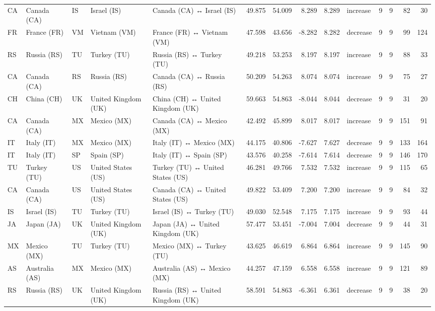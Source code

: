\begin{tabular}{lllllrrrrlrrrr}
CA & Canada (CA) & IS & Israel (IS) & Canada (CA) ↔ Israel (IS) & 49.875 & 54.009 & 8.289 & 8.289 & increase & 9 & 9 & 82 & 30 \\
FR & France (FR) & VM & Vietnam (VM) & France (FR) ↔ Vietnam (VM) & 47.598 & 43.656 & -8.282 & 8.282 & decrease & 9 & 9 & 99 & 124 \\
RS & Russia (RS) & TU & Turkey (TU) & Russia (RS) ↔ Turkey (TU) & 49.218 & 53.253 & 8.197 & 8.197 & increase & 9 & 9 & 88 & 33 \\
CA & Canada (CA) & RS & Russia (RS) & Canada (CA) ↔ Russia (RS) & 50.209 & 54.263 & 8.074 & 8.074 & increase & 9 & 9 & 75 & 27 \\
CH & China (CH) & UK & United Kingdom (UK) & China (CH) ↔ United Kingdom (UK) & 59.663 & 54.863 & -8.044 & 8.044 & decrease & 9 & 9 & 31 & 20 \\
CA & Canada (CA) & MX & Mexico (MX) & Canada (CA) ↔ Mexico (MX) & 42.492 & 45.899 & 8.017 & 8.017 & increase & 9 & 9 & 151 & 91 \\
IT & Italy (IT) & MX & Mexico (MX) & Italy (IT) ↔ Mexico (MX) & 44.175 & 40.806 & -7.627 & 7.627 & decrease & 9 & 9 & 133 & 164 \\
IT & Italy (IT) & SP & Spain (SP) & Italy (IT) ↔ Spain (SP) & 43.576 & 40.258 & -7.614 & 7.614 & decrease & 9 & 9 & 146 & 170 \\
TU & Turkey (TU) & US & United States (US) & Turkey (TU) ↔ United States (US) & 46.281 & 49.766 & 7.532 & 7.532 & increase & 9 & 9 & 115 & 65 \\
CA & Canada (CA) & US & United States (US) & Canada (CA) ↔ United States (US) & 49.822 & 53.409 & 7.200 & 7.200 & increase & 9 & 9 & 84 & 32 \\
IS & Israel (IS) & TU & Turkey (TU) & Israel (IS) ↔ Turkey (TU) & 49.030 & 52.548 & 7.175 & 7.175 & increase & 9 & 9 & 93 & 44 \\
JA & Japan (JA) & UK & United Kingdom (UK) & Japan (JA) ↔ United Kingdom (UK) & 57.477 & 53.451 & -7.004 & 7.004 & decrease & 9 & 9 & 44 & 31 \\
MX & Mexico (MX) & TU & Turkey (TU) & Mexico (MX) ↔ Turkey (TU) & 43.625 & 46.619 & 6.864 & 6.864 & increase & 9 & 9 & 145 & 90 \\
AS & Australia (AS) & MX & Mexico (MX) & Australia (AS) ↔ Mexico (MX) & 44.257 & 47.159 & 6.558 & 6.558 & increase & 9 & 9 & 121 & 89 \\
RS & Russia (RS) & UK & United Kingdom (UK) & Russia (RS) ↔ United Kingdom (UK) & 58.591 & 54.863 & -6.361 & 6.361 & decrease & 9 & 9 & 38 & 20 \\

\end{tabular}
